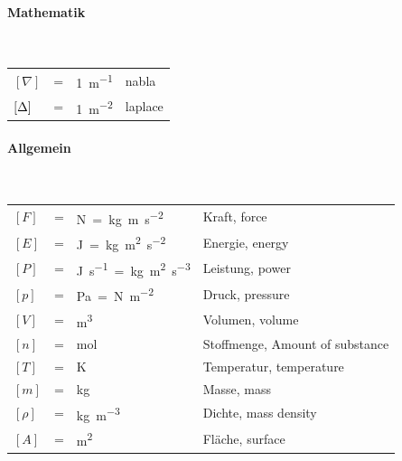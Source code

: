 \documentclass[a4paper, 10pt]{scrartcl}
\begin{document}
	\begin{multicols}{2}
		
		\paragraph{Mathematik} ~\\
		\begin{tabularx}{\linewidth}{lclX}
			$[\nabla]$ &=& \si{1\per\meter} & nabla\\
			$[\Delta]$ &=& \si{1\per\meter\tothe{2}} & laplace\\
		\end{tabularx}
		\paragraph{Allgemein}~\\
		\begin{tabularx}{\linewidth}{lclX}
			$[F]$ &=& \si{\newton=\kilogram\meter\per\second\tothe{2}}& Kraft, force \\
			$[E]$ &=& \si{\joule=\kilogram\meter\tothe{2}\per\second\tothe{2}}& Energie, energy \\
			$[P]$ &=& \si{\joule\per\second=\kilogram\meter\tothe{2}\per\second\tothe{3}}& Leistung, power \\
			$[p]$ &=& \si{\pascal= \newton\per\meter\tothe{2}}& Druck, pressure \\
			$[V]$ &=& \si{\meter\tothe{3}}& Volumen, volume\\
			$[n]$ &=& \si{\mole}& Stoffmenge, Amount of substance\\
			$[T]$ &=& \si{\kelvin}& Temperatur, temperature \\
			$[m]$ &=& \si{\kilogram} & Masse, mass \\
			$[\rho]$ &=& \si{\kilogram\per\meter\tothe{3}} & Dichte, mass density \\
			$[A]$ &=& \si{\meter\tothe{2}} & Fläche, surface\\
		\end{tabularx}

\end{multicols}
\end{document}
